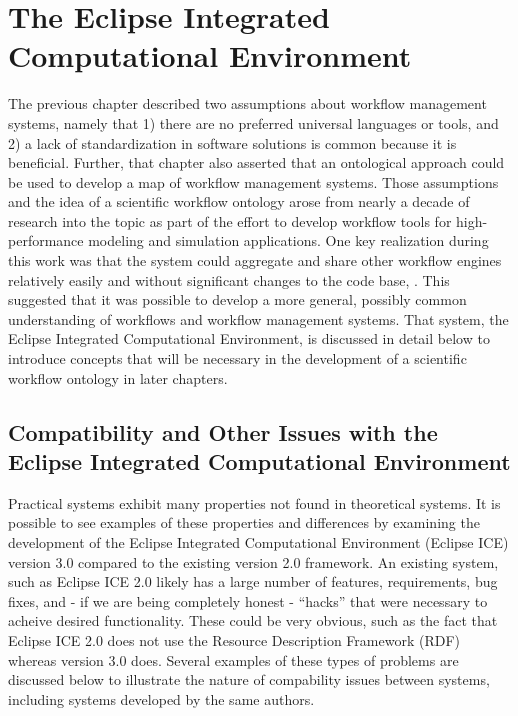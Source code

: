\chapter{The Eclipse Integrated Computational Environment} \label{ch:eclipse-ice}

The previous chapter described two assumptions about workflow management
systems, namely that 1) there are no preferred universal languages or tools,
and 2) a lack of standardization in software solutions is common because it is
beneficial. Further, that chapter also asserted that an ontological approach
could be used to develop a map of workflow management systems. Those assumptions
and the idea of a scientific workflow ontology arose from nearly a decade of
research into the topic as part of the effort to develop workflow tools for
high-performance modeling and simulation applications. One key realization
during this work was that the system could aggregate and share other workflow
engines relatively easily and without significant changes to the code base,
\cite{brooks_introducing_2016}. This suggested that it was possible to develop a
more general, possibly common understanding of workflows and workflow management
systems. That system, the Eclipse Integrated Computational Environment, is
discussed in detail below to introduce concepts that will be necessary in the
development of a scientific workflow ontology in later chapters.


\section{Compatibility and Other Issues with the Eclipse Integrated
Computational Environment}


Practical systems exhibit many properties not found in theoretical systems. It
is possible to see examples of these properties and differences by examining
the development of the Eclipse Integrated Computational Environment (Eclipse
ICE) version 3.0 compared to the existing version 2.0 framework. An existing
system, such as Eclipse ICE 2.0 likely has a large number of features,
requirements, bug fixes, and - if we are being completely honest - ``hacks''
that were necessary to acheive desired functionality. These could be very
obvious, such as the fact that Eclipse ICE 2.0 does not use the Resource
Description Framework (RDF) whereas version 3.0 does. Several examples of these
types of problems are discussed below to illustrate the nature of compability
issues between systems, including systems developed by the same authors.

